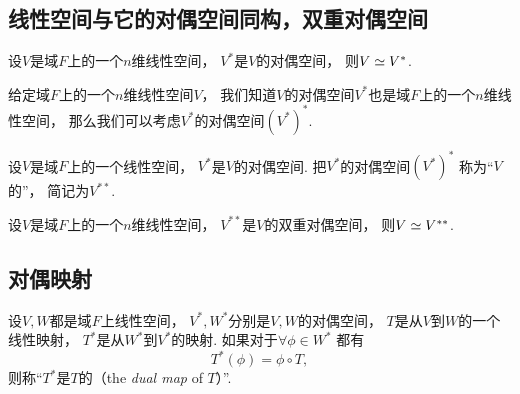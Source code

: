 \subsection{线性空间与它的对偶空间同构，双重对偶空间}
\begin{theorem}\label{theorem:对偶空间.线性空间与它的对偶空间同构}
设\(V\)是域\(F\)上的一个\(n\)维线性空间，
\(V^*\)是\(V\)的对偶空间，
则\(V \simeq V^*\).
\end{theorem}

给定域\(F\)上的一个\(n\)维线性空间\(V\)，
我们知道\(V\)的对偶空间\(V^*\)也是域\(F\)上的一个\(n\)维线性空间，
那么我们可以考虑\(V^*\)的对偶空间\((V^*)^*\).

\begin{definition}
设\(V\)是域\(F\)上的一个线性空间，
\(V^*\)是\(V\)的对偶空间.
把\(V^*\)的对偶空间\((V^*)^*\)
称为“\(V\)的”，
简记为\(V^{**}\).
\end{definition}

\begin{corollary}
设\(V\)是域\(F\)上的一个\(n\)维线性空间，
\(V^{**}\)是\(V\)的双重对偶空间，
则\(V \simeq V^{**}\).
\end{corollary}


\subsection{对偶映射}
\begin{definition}
设\(V,W\)都是域\(F\)上线性空间，
\(V^*,W^*\)分别是\(V,W\)的对偶空间，
\(T\)是从\(V\)到\(W\)的一个线性映射，
\(T^*\)是从\(W^*\)到\(V^*\)的映射.
如果对于\(\forall \phi \in W^*\)
都有\begin{equation*}
	T^*(\phi) = \phi \circ T,
\end{equation*}
则称“\(T^*\)是\(T\)的（the \emph{dual map} of \(T\)）”.
\end{definition}

